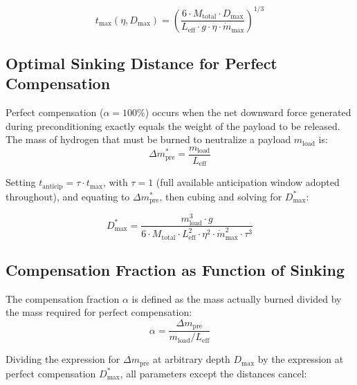 \begin{equation}
  \boxed{t_{\max}(\eta, D_{\max}) = \left(\frac{6 \cdot M_{\text{total}} \cdot D_{\max}}{L_{\text{eff}} \cdot g \cdot \eta \cdot \dot{m}_{\text{max}}}\right)^{1/3}}
\end{equation}

\subsection{Optimal Sinking Distance for Perfect Compensation}
\label{appx:dstar_derivation}

Perfect compensation ($\alpha = 100\%$) occurs when the net downward force generated during preconditioning exactly equals the weight of the payload to be released.
The mass of hydrogen that must be burned to neutralize a payload $m_{\text{load}}$ is:
\begin{equation}
  \Delta m_{\text{pre}}^* = \frac{m_{\text{load}}}{L_{\text{eff}}}
\end{equation}

Setting $t_{\text{anticip}} = \tau \cdot t_{\max}$, with $\tau = 1$ (full available anticipation window adopted throughout), and equating to $\Delta m_{\text{pre}}^*$, then cubing and solving for $D_{\max}^*$:

\begin{equation}
  \boxed{D_{\max}^* = \frac{m_{\text{load}}^3 \cdot g}{6 \cdot M_{\text{total}} \cdot L_{\text{eff}}^2 \cdot \eta^2 \cdot \dot{m}_{\text{max}}^2 \cdot \tau^3}}
\end{equation}

\subsection{Compensation Fraction as Function of Sinking}
\label{appx:alpha_derivation}

The compensation fraction $\alpha$ is defined as the mass actually burned divided by the mass required for perfect compensation:
\begin{equation}
  \alpha = \frac{\Delta m_{\text{pre}}}{m_{\text{load}} / L_{\text{eff}}}
\end{equation}

Dividing the expression for $\Delta m_{\text{pre}}$ at arbitrary depth $D_{\max}$ by the expression at perfect compensation $D_{\max}^*$, all parameters except the distances cancel:

